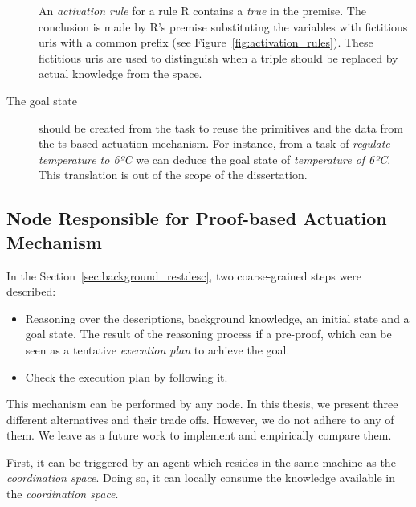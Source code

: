 \begin{description}

	An \emph{activation rule} for a rule R contains a \emph{true} in the premise.
	The conclusion is made by R's premise substituting the variables with fictitious \acsp{uri} with a common prefix (see Figure~\ref{fig:activation_rules}).
	These fictitious \acsp{uri} are used to distinguish when a triple should be replaced by actual knowledge from the space. %


  \item[The goal state] should be created from the task to reuse the primitives and the data from the \ac{ts}-based actuation mechanism.
	For instance, from a task of \emph{regulate temperature to 6ºC} we can deduce the goal state of \emph{temperature of 6ºC}.
	This translation is out of the scope of the dissertation.
\end{description}


\subsection{Node Responsible for Proof-based Actuation Mechanism}
\label{sec:responsible_proof}

In the Section~\ref{sec:background_restdesc}, two coarse-grained steps were described:
\begin{itemize}
  \item Reasoning over the descriptions, background knowledge, an initial state and a goal state.
        The result of the reasoning process if a pre-proof, which can be seen as a tentative \emph{execution plan} to achieve the goal.
  \item Check the execution plan by following it.
\end{itemize}


This mechanism can be performed by any node.
In this thesis, we present three different alternatives and their trade offs.
However, we do not adhere to any of them.
We leave as a future work to implement and empirically compare them.


First, it can be triggered by an agent which resides in the same machine as the \emph{coordination space}.
Doing so, it can locally consume the knowledge available in the \emph{coordination space}.


